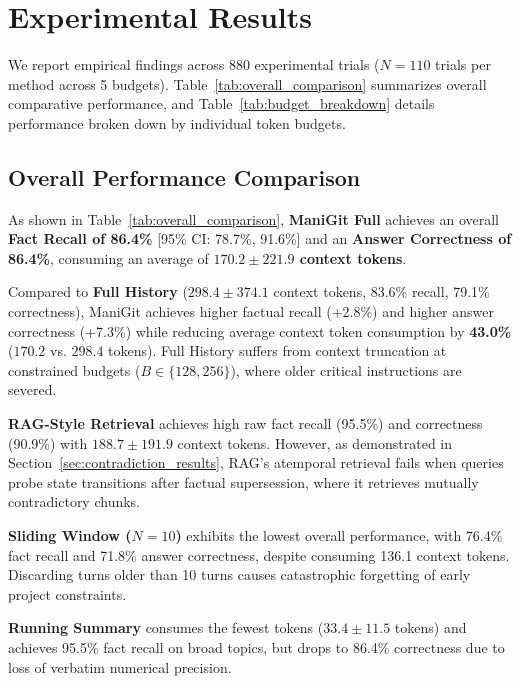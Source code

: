 \section{Experimental Results}
\label{sec:results}

We report empirical findings across 880 experimental trials ($N=110$ trials per method across 5 budgets). Table~\ref{tab:overall_comparison} summarizes overall comparative performance, and Table~\ref{tab:budget_breakdown} details performance broken down by individual token budgets.



\subsection{Overall Performance Comparison}
As shown in Table~\ref{tab:overall_comparison}, \textbf{ManiGit Full} achieves an overall \textbf{Fact Recall of 86.4\%} [95\% CI: 78.7\%, 91.6\%] and an \textbf{Answer Correctness of 86.4\%}, consuming an average of \textbf{$170.2 \pm 221.9$ context tokens}.

Compared to \textbf{Full History} ($298.4 \pm 374.1$ context tokens, 83.6\% recall, 79.1\% correctness), ManiGit achieves higher factual recall (+2.8\%) and higher answer correctness (+7.3\%) while reducing average context token consumption by \textbf{43.0\%} ($170.2$ vs. $298.4$ tokens). Full History suffers from context truncation at constrained budgets ($B \in \{128, 256\}$), where older critical instructions are severed.

\textbf{RAG-Style Retrieval} achieves high raw fact recall (95.5\%) and correctness (90.9\%) with $188.7 \pm 191.9$ context tokens. However, as demonstrated in Section~\ref{sec:contradiction_results}, RAG's atemporal retrieval fails when queries probe state transitions after factual supersession, where it retrieves mutually contradictory chunks.

\textbf{Sliding Window ($N=10$)} exhibits the lowest overall performance, with 76.4\% fact recall and 71.8\% answer correctness, despite consuming 136.1 context tokens. Discarding turns older than 10 turns causes catastrophic forgetting of early project constraints.

\textbf{Running Summary} consumes the fewest tokens ($33.4 \pm 11.5$ tokens) and achieves 95.5\% fact recall on broad topics, but drops to 86.4\% correctness due to loss of verbatim numerical precision.



